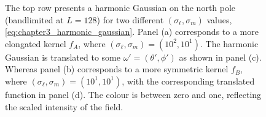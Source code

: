 \begin{figure}[htpb]
	\caption[
		Two harmonic Gaussians on the north pole and then translated
	]{
		The top row presents a harmonic Gaussian on the north pole (bandlimited at \(L=128\)) for two different \((\sigma_{\ell},\sigma_{m})\) values, \cf{} \cref{eq:chapter3_harmonic_gaussian}.
		Panel (a) corresponds to a more elongated kernel \(f_{A}\), where \((\sigma_{\ell},\sigma_{m}) = (10^{2},10^{1})\).
		The harmonic Gaussian is translated to some \(\omega'=(\theta',\phi')\) as shown in panel (c).
		Whereas panel (b) corresponds to a more symmetric kernel \(f_{B}\), where \((\sigma_{\ell},\sigma_{m}) = (10^{1},10^{1})\), with the corresponding translated function in panel (d).
		The colour is between zero and one, reflecting the scaled intensity of the field.
	}\label{fig:chapter3_harmonic_gaussian}
\end{figure}
